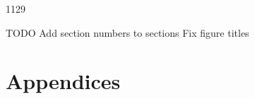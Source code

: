 \documentclass[11pt, a4paper]{article}
\begin{document}
1129

TODO
  Add section numbers to sections
  Fix figure titles











%





% 

% 

% 

% 

% 

\newpage




\newpage
\section{Appendices}
\end{document}
